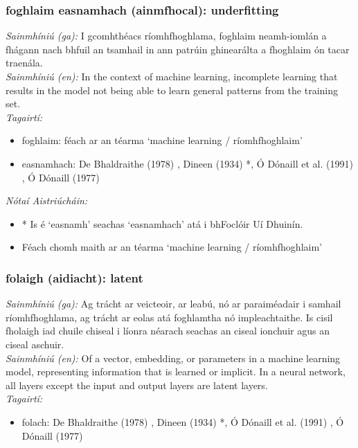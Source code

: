 \documentclass{article}
\begin{document}
\subsubsection*{foghlaim easnamhach (ainmfhocal): underfitting}
 \noindent \textit{Sainmhíniú (ga):} I gcomhthéacs ríomhfhoghlama, foghlaim neamh-iomlán a fhágann nach bhfuil an tsamhail in ann patrúin ghinearálta a fhoghlaim ón tacar traenála.
\\
 \noindent \textit{Sainmhíniú (en):} In the context of machine learning, incomplete learning that results in the model not being able to learn general patterns from the training set.
\\
 \noindent \textit{Tagairtí:}
\begin{itemize}
	\item foghlaim: féach ar an téarma `machine learning / ríomhfhoghlaim'
	\item easnamhach: De Bhaldraithe (1978) \cite{de-bhaldraithe}, Dineen (1934) \cite{dineen}*, Ó Dónaill et al. (1991) \cite{focloir-beag}, Ó Dónaill (1977) \cite{odonaill}
\end{itemize}

 \noindent \textit{Nótaí Aistriúcháin:}
\begin{itemize}
	\item * Is é `easnamh' seachas `easnamhach' atá i bhFoclóir Uí Dhuinín.
	\item Féach chomh maith ar an téarma `machine learning / ríomhfhoghlaim'
\end{itemize}


\subsubsection*{folaigh (aidiacht): latent}
 \noindent \textit{Sainmhíniú (ga):} Ag trácht ar veicteoir, ar leabú, nó ar paraiméadair i samhail ríomhfhoghlama, ag trácht ar eolas atá foghlamtha nó impleachtaithe. Is cisil fholaigh iad chuile chiseal i líonra néarach seachas an ciseal ionchuir agus an ciseal aschuir.
\\
 \noindent \textit{Sainmhíniú (en):} Of a vector, embedding, or parameters in a machine learning model, representing information that is learned or implicit. In a neural network, all layers except the input and output layers are latent layers.
\\
 \noindent \textit{Tagairtí:}
\begin{itemize}
	\item folach: De Bhaldraithe (1978) \cite{de-bhaldraithe}, Dineen (1934) \cite{dineen}*, Ó Dónaill et al. (1991) \cite{focloir-beag}, Ó Dónaill (1977) \cite{odonaill}
\end{itemize}
\end{document}

